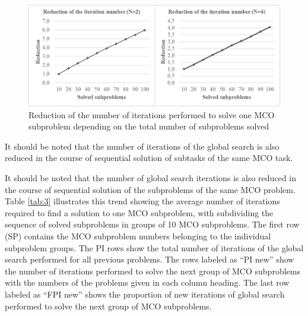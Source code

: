 \documentclass[smallextended]{svjour3}       %
\begin{document}
\begin{figure}
  \centering
  \includegraphics[width=1\linewidth]{fig5}
  \caption{Reduction of the number of iterations performed to solve one MCO subproblem depending on the total number of subproblems solved}
  \label{fig:5}
\end{figure}

It should be noted that the number of iterations of the global search is also reduced in the course of sequential solution of subtasks of the same MCO task.

It should be noted that the number of global search iterations is also reduced in the course of sequential solution of the subproblems of the same MCO problem. Table \ref{tab:3} illustrates this trend showing the average number of iterations required to find a solution to one MCO subproblem, with subdividing the sequence of solved subproblems in groups of 10 MCO subproblems. The first row (SP) contains the MCO subproblem numbers belonging to the individual subproblem groups. The PI rows show the total number of iterations of the global search performed for all previous problems. The rows labeled as ``PI new'' show the number of iterations performed to solve the next group of MCO subproblems with the numbers of the problems given in each column heading. The last row labeled as ``FPI new'' shows the proportion of new iterations of global search performed to solve the next group of MCO subproblems.
\end{document}
